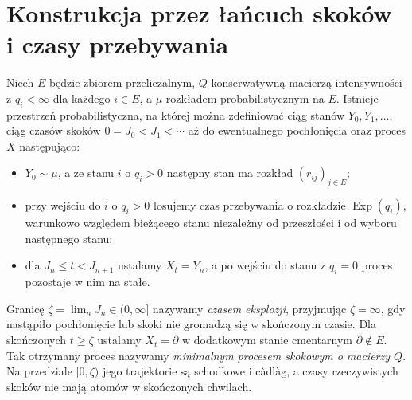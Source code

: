 \section{Konstrukcja przez łańcuch skoków i czasy przebywania}
\begin{twierdzenie}
\label{thm:jump-construction}
Niech $E$ będzie zbiorem przeliczalnym, $Q$ konserwatywną
macierzą intensywności z $q_i<\infty$ dla każdego $i\in E$,
a $\mu$ rozkładem probabilistycznym na $E$.
Istnieje przestrzeń probabilistyczna, na której można
zdefiniować ciąg stanów $Y_0,Y_1,\ldots$, ciąg czasów skoków
$0=J_0<J_1<\cdots$ aż do ewentualnego pochłonięcia oraz
proces $X$ następująco:
\begin{itemize}
\item $Y_0\sim\mu$, a ze stanu $i$ o $q_i>0$ następny stan
ma rozkład $(r_{ij})_{j\in E}$;
\item przy wejściu do $i$ o $q_i>0$ losujemy czas przebywania
o rozkładzie $\operatorname{Exp}(q_i)$, warunkowo względem
bieżącego stanu niezależny od przeszłości i od wyboru
następnego stanu;
\item dla $J_n\le t<J_{n+1}$ ustalamy $X_t=Y_n$,
a po wejściu do stanu z $q_i=0$ proces pozostaje w nim na stałe.
\end{itemize}
Granicę $\zeta=\lim_n J_n\in(0,\infty]$ nazywamy
\emph{czasem eksplozji}, przyjmując $\zeta=\infty$,
gdy nastąpiło pochłonięcie lub skoki nie gromadzą się
w skończonym czasie. Dla skończonych $t\ge\zeta$
ustalamy $X_t=\partial$ w dodatkowym stanie cmentarnym
$\partial\notin E$. Tak otrzymany proces nazywamy
\emph{minimalnym procesem skokowym o macierzy $Q$}.
Na przedziale $[0,\zeta)$ jego trajektorie są schodkowe i
c\`adl\`ag, a czasy rzeczywistych skoków nie mają atomów
w skończonych chwilach.
\end{twierdzenie}
